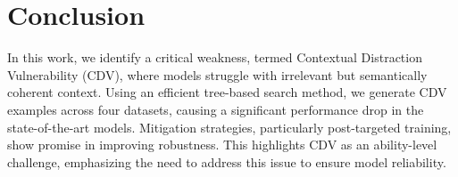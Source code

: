 \section{Conclusion}

In this work, we identify a critical weakness, termed Contextual Distraction Vulnerability (CDV), where models struggle with irrelevant but semantically coherent context. Using an efficient tree-based search method, we generate CDV examples across four datasets, causing a significant performance drop in the state-of-the-art models. Mitigation strategies, particularly post-targeted training, show promise in improving robustness. This highlights CDV as an ability-level challenge, emphasizing the need to address this issue to ensure model reliability.
